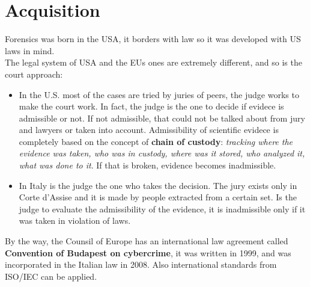 \chapter{Acquisition}
    Forensics was born in the USA, it borders with law so it was developed with US laws in mind.\\
    The legal system of USA and the EUs ones are extremely different, and so is the court approach:
    \begin{itemize}
        \item In the U.S. most of the cases are tried by juries of peers, the judge works to make the court work. In fact, the judge is the one to decide if evidece is admissible or not. If not admissible, that could not be talked about from jury and lawyers or taken into account. Admissibility of scientific evidece is completely based on the concept of \textbf{chain of custody}: \textit{tracking where the evidence was taken, who was in custody, where was it stored, who analyzed it, what was done to it}. If that is broken, evidence becomes inadmissible.
        \item In Italy is the judge the one who takes the decision. The jury exists only in Corte d'Assise and it is made by people extracted from a certain set. Is the judge to evaluate the admissibility of the evidence, it is inadmissible only if it was taken in violation of laws.
    \end{itemize}
    By the way, the Counsil of Europe has an international law agreement called \textbf{Convention of Budapest on cybercrime}, it was written in 1999, and was incorporated in the Italian law in 2008. Also international standards from ISO/IEC can be applied.
